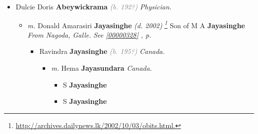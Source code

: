 \documentclass[10pt, openany]{book}
\begin{document}
\begin{itemize}
{\begin{itemize}
{\begin{itemize}
{\begin{itemize}
\item{Vajira \textbf{Nagodawithana} \textcolor{gray}{\textit{(b. 195?)}}
\begin{itemize}
\item{\textit{m.} Chintha \textbf{Perera} \textcolor{slorange}{\textit{}}   \label{couple:00000564:00000595} \begin{itemize}
\item{Kavinda \textbf{Nagodawithana} \textcolor{slorange}{\textit{}}
 }
\item{Amaya \textbf{Nagodawithana} \textcolor{slorange}{\textit{}}
 }
\end{itemize}}
\end{itemize}
 }
\item{Kumar \textbf{Nagodawithana} \textcolor{gray}{\textit{(b. 196?)}}
 }
\item{Anoja \textbf{Nagodawithana} \textcolor{gray}{\textit{(b. 196?)}}
 }
\end{itemize}}
\end{itemize}
 }
\item{Dulcie Doris \textbf{Abeywickrama} \textcolor{gray}{\textit{(b. 192?)}} \textcolor{slmaroon}{\textit{Physician.}}
\begin{itemize}
\item{\textit{m.} Donald Amarasiri \textbf{Jayasinghe} \textcolor{slorange}{\textit{(d. 2002)}} \textcolor{slmaroon}{\textit{\footnote{\url{http://archives.dailynews.lk/2002/10/03/obits.html.}}}} Son of  M A \textbf{Jayasinghe} \textcolor{slorange}{\textit{}} \textcolor{slmaroon}{\textit{From Nagoda, Galle.}} \textcolor{slteal}{\textit{See  \autoref{00000328} \textit{, p. \pageref{00000328} }}}   \label{couple:00000031:00000325} \begin{itemize}
\item{Ravindra  \textbf{Jayasinghe} \textcolor{gray}{\textit{(b. 195?)}} \textcolor{slmaroon}{\textit{Canada.}}
\begin{itemize}
\item{\textit{m.} Hema \textbf{Jayasundara} \textcolor{slorange}{\textit{}} \textcolor{slmaroon}{\textit{Canada.}}   \label{couple:00000336:00000347} \begin{itemize}
\item{S \textbf{Jayasinghe} \textcolor{slorange}{\textit{}}
 }
\item{S \textbf{Jayasinghe} \textcolor{slorange}{\textit{}}
}
\end{itemize}}
\end{itemize}}
\end{itemize}}
\end{itemize}}
\end{itemize}}
\end{itemize}
\end{document}
